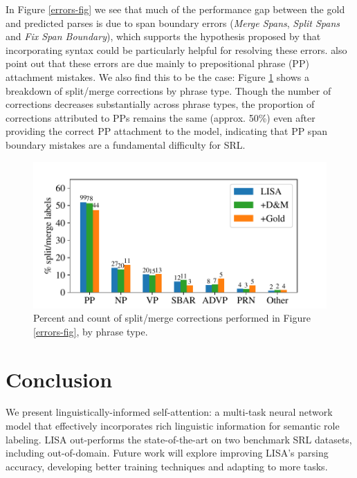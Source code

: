 \documentclass[11pt,a4paper]{article}
\begin{document}
In Figure \ref{errors-fig} we see that much of the performance gap between the gold and predicted parses is due to span boundary errors (\emph{Merge Spans}, \emph{Split Spans} and \emph{Fix Span Boundary}), which supports the hypothesis proposed by \citet{he2017deep} that incorporating syntax could be particularly helpful for resolving these errors. 
\citet{he2017deep} also point out that these errors are due mainly to prepositional phrase (PP) attachment mistakes. We also find this to be the case: Figure \ref{fig:phrase-bar} shows a breakdown of split/merge corrections by phrase type. Though the number of corrections decreases substantially across phrase types, the proportion of corrections attributed to PPs remains the same (approx. 50\%) even after providing the correct PP attachment to the model, indicating that PP span boundary mistakes are a fundamental difficulty for SRL.

\begin{figure}
\centering
\includegraphics[scale=0.55]{phrase_bar_percent.pdf}
\caption{Percent and count of split/merge corrections performed in Figure \ref{errors-fig}, by phrase type. \label{fig:phrase-bar}}
\end{figure}

\section{Conclusion}
We present linguistically-informed self-attention: a multi-task neural network model that effectively incorporates rich linguistic information for semantic role labeling. LISA out-performs the state-of-the-art on two benchmark SRL datasets, including out-of-domain. Future work will explore improving LISA's parsing accuracy, developing better training techniques and adapting to more tasks.
\end{document}
